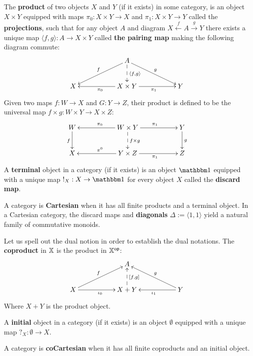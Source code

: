 \begin{definition}
The {\bf product} of two objects $X$ and $Y$ (if it exists) in some category, is an object $X\times Y$ equipped with maps $\pi_0:X\times Y\to X $ and $\pi_1:X\times Y \to Y$ called the {\bf projections},  such that for any object $A$ and diagram  $X \xleftarrow{f} A \xrightarrow{g} Y$ there exists a unique map $\langle  f, g \rangle :A \to X\times Y$ called {\bf the pairing map} making the following diagram commute:
$$
\xymatrix{
    &
    & A \ar[lld]_f \ar[rrd]^g \ar@{-->}[d]^{\langle f,g\rangle}
    &
    &
  \\X 
    &
    & X\times Y \ar[ll]^{\pi_0} \ar[rr]_{\pi_1}
    &
    & Y
}
$$ 
Given two maps $f:W\to X$ and $G:Y\to Z$, their product is defined to be the universal map $f\times g:W\times Y \to X\times Z$: 
$$
\xymatrix{
    W \ar[d]_f
    &
    & W\times Y \ar@{-->}[d]^{f\times g} \ar[ll]_{\pi_0} \ar[rr]^{\pi_1}
    &
    & Y \ar[d]^g
  \\X
    &
    & Y\times Z  \ar[ll]_{\pi^0} \ar[rr]_{\pi_1}
    &
    &Z
}
$$
A {\bf terminal} object in a category (if it exists) is an object $\one$ equipped with a unique map $!_X:X\to \one$ for every object $X$ called the {\bf discard map}.



A category is  {\bf Cartesian} when it has all finite products and a terminal object. In a Cartesian category, the discard maps and {\bf diagonals} $\Delta:=\langle 1, 1 \rangle$ yield a natural family of commutative monoids.





Let us spell out the dual notion in order to establish the dual notations.
The {\bf coproduct} in $\mathbb{X}$ is the product in $\mathbb{X}^{\mathsf{op}}$:
$$
\xymatrix{
    &
    & A
    &
    &
  \\X \ar[urr]^{f} \ar[rr]_{\iota_0}
    &
    & X+  Y \ar@{-->}[u]_{[f,g]} 
    &
    & Y\ar[ull]_{g}  \ar[ll]^{\iota_1}
}
$$ 
Where $ X+  Y $ is the product object.%


A {\bf initial} object in a category (if it exists) is an object $\emptyset$ equipped with a unique map $?_X: \emptyset\to  X$. %

A category is  {\bf coCartesian} when it has all finite coproducts and an initial object.%
\end{definition}
